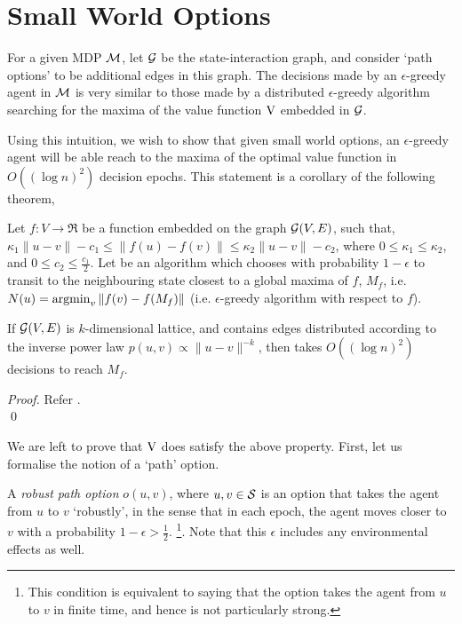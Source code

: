 \section{Small World Options}
\label{sec:theory}

For a given MDP $\mathcal{M}$, let $\mathcal{G}$ be the state-interaction graph,
and consider `path options' to be additional edges in this graph. The
decisions made by an $\epsilon$-greedy agent in $\mathcal{M}$ is very similar
to those made by a distributed $\epsilon$-greedy algorithm searching
for the maxima of the value function $\operatorname{V}$ embedded in $\mathcal{G}$. 

Using this intuition, we wish to show that given small world options,
an $\epsilon$-greedy agent will be able reach to the maxima of the
optimal value function in $O( (\log n)^2 )$ decision epochs. This
statement is a corollary of the following theorem,

\begin{theorem}
    \label{thm:small-world}
    Let $f : V \to \Re$ be a function embedded on the graph
    $\mathcal{G}(V,E)$, such that, $\kappa_1 \|u-v\| - c_1 \le \|f(u) -
    f(v)\| \le \kappa_2 \|u - v\| - c_2$, where $0 \le \kappa_1 \le
    \kappa_2$, and $0 \le c_2 \le \frac{c_1}{2}$. Let \egreedyalgo be
    an algorithm which chooses with probability $1-\epsilon$ to
    transit to the neighbouring state closest to a global maxima of
    $f$, $M_f$, i.e. $N(u) = \operatorname{argmin}_v \|f(v) - f(M_f)\|$ (i.e.
    $\epsilon$-greedy algorithm with respect to $f$).
    
    If $\mathcal{G}(V,E)$ is $k$-dimensional lattice, and contains edges
    distributed according to the inverse power law $p(u,v) \propto
    \|u-v\|^{-k}$, then \egreedyalgo takes $O( (\log n)^2 )$ decisions
    to reach $M_f$.
\end{theorem}
\begin{proof}
    Refer .
    \\ \qed
\end{proof}

We are left to prove that $\operatorname{V}$ does satisfy the above property.
First, let us formalise the notion of a `path' option.

\begin{definition}
    A {\em robust path option} $o(u,v)$, where $u,v \in \mathcal{S}$ is an
    option that takes the agent from $u$ to $v$ `robustly', in the
    sense that in each epoch, the agent moves closer to $v$ with a
    probability $1-\epsilon > \frac{1}{2}$. \footnote{This condition
    is equivalent to saying that the option takes the agent from $u$
    to $v$ in finite time, and hence is not particularly strong.}.
    Note that this $\epsilon$ includes any environmental effects as
    well.
\end{definition}


